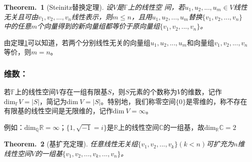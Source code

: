 \documentclass[zihao=5,UTF8]{report}
\theoremstyle{mystyle} %
\newtheorem{theorem}{Theorem.\,}
\begin{document}
\begin{theorem}[Steinitz替换定理]\label{Steinitz替换定理}
    设$V$是$\mathbb{F}$上的线性空 间，若$u_1,u_2,...,u_m\in V$线性无关且可由$v_1,v_2,...,v_n$线性表示，则$m\le n$，且用$u_1,u_2,...,u_m$替换$\{v_1,v_2,...,v_n\}$中的任意$m$个向量得到的新向量组都等价于原向量组$\{v_1,v_2,...,v_n\}$。
\end{theorem}
{\color{gray}\small  由定理\ref{Steinitz替换定理}可以知道，若两个分别线性无关的向量组$u_1,u_2,...,u_m$和向量组$v_1,v_2,...,v_n$等价，则$m=n$。}
\subsubsection{维数：}
若$\mathbb{F}$上的线性空间$V$存在一组有限基$S$，则$S$元素的个数称为$V$的维数，记作$\text{dim}_{\mathbb{F}}V=|S|$，简记为$\text{dim}\ V=|S|$。特别地，我们称零空间$\{0\}$是零维的，称不存在有限基的线性空间是无限维的，记作$\text{dim}\ V = \infty$。\par
{\color{gray}\small 
例如：$\text{dim}_{\mathbb{Q}}\mathbb{R}= \infty$；$\{1,\sqrt{-1}=i\}$是$\mathbb{R}$上的线性空间$\mathbb{C}$的一组基，故$\text{dim}_{\mathbb{R}}\mathbb{C}=2$}

\begin{theorem}[基扩充定理]
    任意线性无关组$\{v_1,v_2,...,v_k\}(k<n)$可扩充为$n$维线性空间$V$的一组基$\{v_1,v_2,...,v_k,...,v_n\}$。
\end{theorem}
\end{document}
